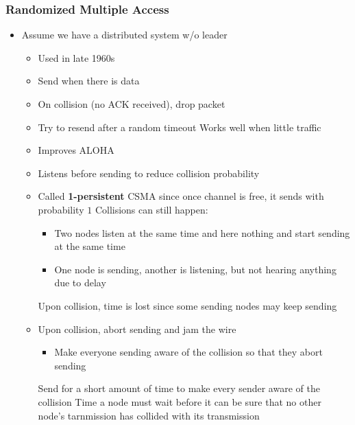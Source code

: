 \subsubsection{Randomized Multiple Access}
\begin{itemize}
    \item Assume we have a distributed system w/o leader
        \begin{itemize}
            \item Used in late 1960s
            \item Send when there is data
            \item On collision (no ACK received), drop packet
            \item Try to resend after a random timeout
            \ipro Works well when little traffic
        \end{itemize}
        \begin{itemize}
            \item Improves ALOHA
            \item Listens before sending to reduce collision probability
            \item Called \textbf{1-persistent} CSMA since once channel is free, it sends with probability $1$
            \icon Collisions can still happen:
                \begin{itemize}
                    \item Two nodes listen at the same time and here nothing and start sending at the same time
                    \item One node is sending, another is listening, but not hearing anything due to delay
                \end{itemize}
            \icon Upon collision, time is lost since some sending nodes may keep sending
        \end{itemize}
        \begin{itemize}
            \item Upon collision, abort sending and jam the wire
                \begin{itemize}
                    \item Make everyone sending aware of the collision so that they abort sending \end{itemize}
             Send for a short amount of time to make every sender aware of the collision
             Time a node must wait before it can be sure that no other node's tarnmission has collided with its transmission

\end{itemize}
\end{itemize}
